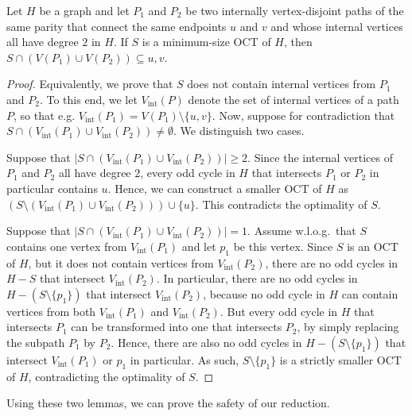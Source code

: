 \begin{lemma} \label{lem:new:vertices:not:optimal}
	Let $H$ be a graph and let $P_1$ and $P_2$ be two internally vertex-disjoint paths of the same parity that connect the same endpoints $u$ and $v$ and whose internal vertices all have degree $2$ in $H$. If $S$ is a minimum-size OCT of $H$, then $S \cap (V(P_1) \cup V(P_2)) \subseteq {u, v}$. 
\end{lemma}
\begin{proof}
	\newcommand{\Vint}{V_{\text{int}}}
	Equivalently, we prove that $S$ does not contain internal vertices from $P_1$ and $P_2$. To this end, we let $\Vint(P)$ denote the set of internal vertices of a path $P$, so that e.g. $\Vint(P_1) = V(P_1) \setminus \{u, v\}$. Now, suppose for contradiction that $S \cap (\Vint(P_1) \cup \Vint(P_2)) \neq \emptyset$. We distinguish two cases.
	
	Suppose that $|S \cap (\Vint(P_1) \cup \Vint(P_2))| \geq 2$. Since the internal vertices of $P_1$ and $P_2$ all have degree $2$, every odd cycle in $H$ that intersects $P_1$ or $P_2$ in particular contains $u$. Hence, we can construct a smaller OCT of $H$ as $(S \setminus (\Vint(P_1) \cup \Vint(P_2))) \cup \{u\}$. This contradicts the optimality of $S$.
	
	Suppose that $|S \cap (\Vint(P_1) \cup \Vint(P_2))| = 1$. Assume w.l.o.g.~that $S$ contains one vertex from $\Vint(P_1)$ and let $p_1$ be this vertex. Since $S$ is an OCT of $H$, but it does not contain vertices from $\Vint(P_2)$, there are no odd cycles in $H - S$ that intersect $\Vint(P_2)$. In particular, there are no odd cycles in $H - (S \setminus \{p_1\})$ that intersect $\Vint(P_2)$, because no odd cycle in $H$ can contain vertices from both $\Vint(P_1)$ and $\Vint(P_2)$. But every odd cycle in $H$ that intersects $P_1$ can be transformed into one that intersects $P_2$, by simply replacing the subpath $P_1$ by $P_2$. Hence, there are also no odd cycles in $H - (S \setminus \{p_1\})$ that intersect $\Vint(P_1)$ or $p_1$ in particular. As such, $S \setminus \{p_1\}$ is a strictly smaller OCT of $H$, contradicting the optimality of $S$.
\end{proof}

Using these two lemmas, we can prove the safety of our reduction.

